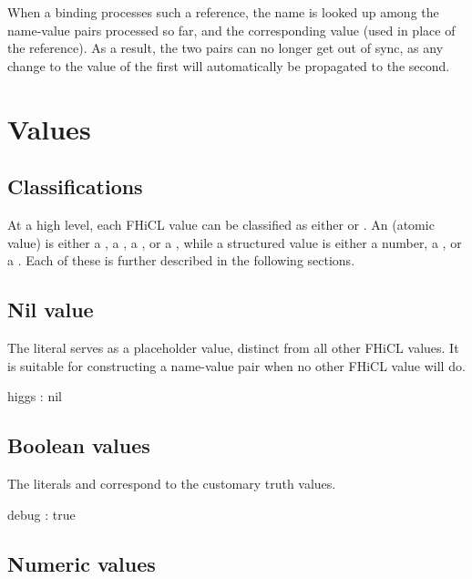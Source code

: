 \documentclass{memarticle}
\newcommand{\fhicl}%
 {FHiCL\xspace}
\begin{document}
When a binding processes such a reference,
the name is looked up
among the name-value pairs processed so far,
and the corresponding value
 (used in place of the reference).
As a result,
the two pairs can no longer get out of sync,
as any change to the value of the first
will automatically be propagated to the second.


\chapter{Values}

\section{Classifications}

At a high level,
each \fhicl value can be classified
as either  or .
An  (atomic value)
is either
  a ,
  a ,
  a ,
or
  a ,
while a structured value is either
  a  number,
  a ,
or
  a .
Each of these is further described in the following sections.

\section{Nil value}

The literal 
serves as a placeholder value,
distinct from all other \fhicl values.
It is suitable for constructing a name-value pair
when no other \fhicl value will do.
\Needspace{0.17in}
\begin{fcllisting}[texcl,escapechar=`]
higgs : nil
\end{fcllisting}

\section{Boolean values}

The literals  and 
correspond to the customary truth values.
\Needspace{0.17in}
\begin{fcllisting}[texcl,escapechar=`]
debug : true
\end{fcllisting}

\section{Numeric values}
\end{document}
